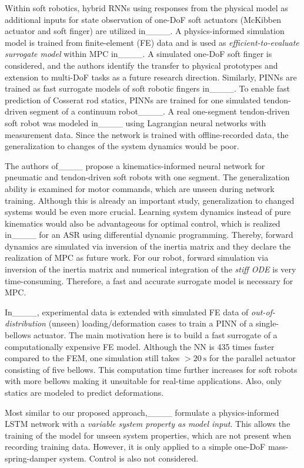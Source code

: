 Within soft robotics, hybrid RNNs using responses from the physical model as additional inputs for state observation of one-DoF soft actuators (McKibben actuator and soft finger) are utilized in____. 
A physics-informed simulation model is trained from finite-element (FE) data and is used as \textit{efficient-to-evaluate surrogate model} within MPC in____. 
A simulated one-DoF soft finger is considered, and the authors identify the transfer to physical prototypes and extension to multi-DoF tasks as a future research direction. 
Similarly, PINNs are trained as fast surrogate models of soft robotic fingers in____.
To enable fast prediction of Cosserat rod statics, PINNs are trained for one simulated tendon-driven segment of a continuum robot____.
A real one-segment tendon-driven soft robot was modeled in____ using Lagrangian neural networks with measurement data. 
Since the network is trained with offline-recorded data, the generalization to changes of the system dynamics would be poor.

The authors of____ propose a kinematics-informed neural network for pneumatic and tendon-driven soft robots with one segment. 
The generalization ability is examined for motor commands, which are unseen during network training. 
Although this is already an important study, generalization to changed systems would be even more crucial. 
Learning system dynamics instead of pure kinematics would also be advantageous for optimal control, which is realized in____ for an ASR using differential dynamic programming. 
Thereby, forward dynamics are simulated via inversion of the inertia matrix and they declare the realization of MPC as future work. 
For our robot, forward simulation via inversion of the inertia matrix and numerical integration of the \textit{stiff ODE} is very time-consuming. 
Therefore, a fast and accurate surrogate model is necessary for MPC. 

In____, experimental data is extended with simulated FE data of \textit{out-of-distribution} (unseen) loading/deformation cases to train a PINN of a single-bellows actuator. 
The main motivation here is to build a fast surrogate of a computationally expensive FE model.
Although the NN is 435 times faster compared to the FEM, one simulation still takes ${>}\SI{20}{\second}$ for the parallel actuator consisting of five bellows. 
This computation time further increases for soft robots with more bellows making it unsuitable for real-time applications. 
Also, only statics are modeled to predict deformations.

Most similar to our proposed approach,____ formulate a physics-informed LSTM network with a \textit{variable system property as model input}. 
This allows the training of the model for unseen system properties, which are not present when recording training data. 
However, it is only applied to a simple one-DoF mass-spring-damper system.
Control is also not considered.

